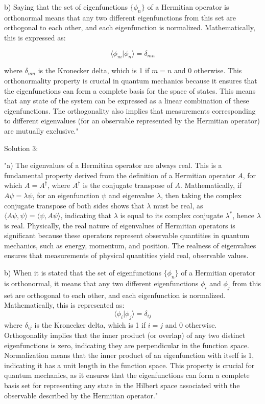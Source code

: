 b) Saying that the set of eigenfunctions \(\{ \phi_{n} \}\) of a Hermitian operator is orthonormal means that any two different eigenfunctions from this set are orthogonal to each other, and each eigenfunction is normalized. Mathematically, this is expressed as:

\[
\langle \phi_{m} | \phi_{n} \rangle = \delta_{mn}
\]

where \(\delta_{mn}\) is the Kronecker delta, which is 1 if \(m = n\) and 0 otherwise. This orthonormality property is crucial in quantum mechanics because it ensures that the eigenfunctions can form a complete basis for the space of states. This means that any state of the system can be expressed as a linear combination of these eigenfunctions. The orthogonality also implies that measurements corresponding to different eigenvalues (for an observable represented by the Hermitian operator) are mutually exclusive."

Solution 3: 

"a) The eigenvalues of a Hermitian operator are always real. This is a fundamental property derived from the definition of a Hermitian operator \(A\), for which \(A = A^\dagger\), where \(A^\dagger\) is the conjugate transpose of \(A\). Mathematically, if \(A\psi = \lambda\psi\), for an eigenfunction \(\psi\) and eigenvalue \(\lambda\), then taking the complex conjugate transpose of both sides shows that \(\lambda\) must be real, as \(\langle A\psi, \psi \rangle = \langle \psi, A\psi \rangle\), indicating that \(\lambda\) is equal to its complex conjugate \(\lambda^*\), hence \(\lambda\) is real. Physically, the real nature of eigenvalues of Hermitian operators is significant because these operators represent observable quantities in quantum mechanics, such as energy, momentum, and position. The realness of eigenvalues ensures that measurements of physical quantities yield real, observable values.

b) When it is stated that the set of eigenfunctions \(\{ \phi_{n} \}\) of a Hermitian operator is orthonormal, it means that any two different eigenfunctions \(\phi_i\) and \(\phi_j\) from this set are orthogonal to each other, and each eigenfunction is normalized. Mathematically, this is represented as:
\[ \langle \phi_i | \phi_j \rangle = \delta_{ij} \]
where \(\delta_{ij}\) is the Kronecker delta, which is 1 if \(i = j\) and 0 otherwise. Orthogonality implies that the inner product (or overlap) of any two distinct eigenfunctions is zero, indicating they are perpendicular in the function space. Normalization means that the inner product of an eigenfunction with itself is 1, indicating it has a unit length in the function space. This property is crucial for quantum mechanics, as it ensures that the eigenfunctions can form a complete basis set for representing any state in the Hilbert space associated with the observable described by the Hermitian operator."



